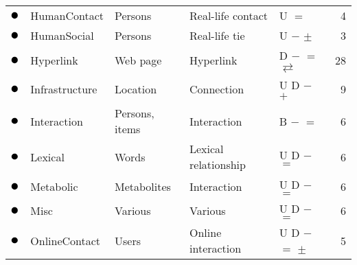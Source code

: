 \begin{tabular}{lllllr}
\textcolor{colorHumanContact}{$\newmoon$} &HumanContact & Persons & Real-life contact & U \phantom{D} \phantom{B} \phantom{$-$} $=$ \phantom{$+$} \phantom{$\pm$} \phantom{$\stackrel{+}{=}$} \phantom{$*$} \phantom{$_*{}^*$} \phantom{$\rightleftarrows$} \phantom{$++$}  &  4 \\
\textcolor{colorHumanSocial}{$\newmoon$} &HumanSocial & Persons & Real-life tie & U \phantom{D} \phantom{B} $-$ \phantom{$=$} \phantom{$+$} $\pm$ \phantom{$\stackrel{+}{=}$} \phantom{$*$} \phantom{$_*{}^*$} \phantom{$\rightleftarrows$} \phantom{$++$}  &  3 \\
\textcolor{colorHyperlink}{$\newmoon$} &Hyperlink & Web page & Hyperlink & \phantom{U} D \phantom{B} $-$ $=$ \phantom{$+$} \phantom{$\pm$} \phantom{$\stackrel{+}{=}$} \phantom{$*$} \phantom{$_*{}^*$} $\rightleftarrows$ \phantom{$++$}  &  28 \\
\textcolor{colorInfrastructure}{$\newmoon$} &Infrastructure & Location & Connection & U D \phantom{B} $-$ \phantom{$=$} $+$ \phantom{$\pm$} \phantom{$\stackrel{+}{=}$} \phantom{$*$} \phantom{$_*{}^*$} \phantom{$\rightleftarrows$} \phantom{$++$}  &  9 \\
\textcolor{colorInteraction}{$\newmoon$} &Interaction & Persons, items & Interaction & \phantom{U} \phantom{D} B $-$ $=$ \phantom{$+$} \phantom{$\pm$} \phantom{$\stackrel{+}{=}$} \phantom{$*$} \phantom{$_*{}^*$} \phantom{$\rightleftarrows$} \phantom{$++$}  &  6 \\
\textcolor{colorLexical}{$\newmoon$} &Lexical & Words & Lexical relationship & U D \phantom{B} $-$ $=$ \phantom{$+$} \phantom{$\pm$} \phantom{$\stackrel{+}{=}$} \phantom{$*$} \phantom{$_*{}^*$} \phantom{$\rightleftarrows$} \phantom{$++$}  &  6 \\
\textcolor{colorMetabolic}{$\newmoon$} &Metabolic & Metabolites & Interaction & U D \phantom{B} $-$ $=$ \phantom{$+$} \phantom{$\pm$} \phantom{$\stackrel{+}{=}$} \phantom{$*$} \phantom{$_*{}^*$} \phantom{$\rightleftarrows$} \phantom{$++$}  &  6 \\
\textcolor{colorMisc}{$\newmoon$} &Misc & Various & Various & U D \phantom{B} $-$ $=$ \phantom{$+$} \phantom{$\pm$} \phantom{$\stackrel{+}{=}$} \phantom{$*$} \phantom{$_*{}^*$} \phantom{$\rightleftarrows$} \phantom{$++$}  &  6 \\
\textcolor{colorOnlineContact}{$\newmoon$} &OnlineContact & Users & Online interaction & U D \phantom{B} $-$ $=$ \phantom{$+$} $\pm$ \phantom{$\stackrel{+}{=}$} \phantom{$*$} \phantom{$_*{}^*$} \phantom{$\rightleftarrows$} \phantom{$++$}  &  5 \\

\end{tabular}
